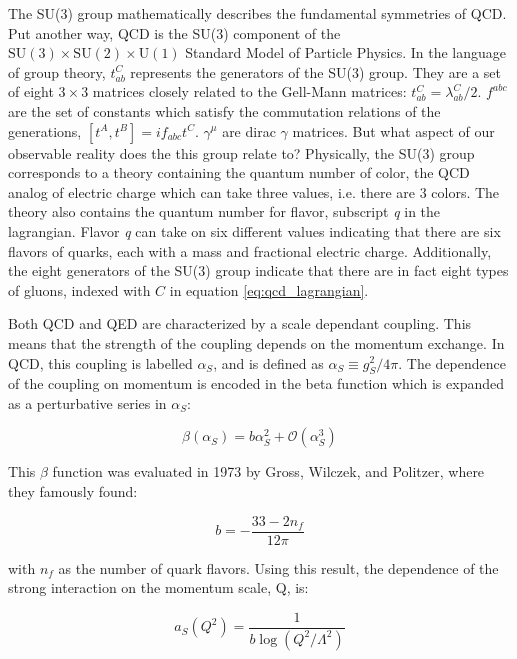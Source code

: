 The SU(3) group mathematically describes the fundamental symmetries of QCD. Put another way, QCD is the SU(3) component of the $\mathrm{SU(3)}\times\mathrm{SU(2)}\times\mathrm{U(1)}$ Standard Model of Particle Physics. In the language of group theory, $t_{ab}^C$ represents the generators of the SU(3) group. They are a set of eight $3\times3$ matrices closely related to the Gell-Mann matrices: $t_{ab}^C = \lambda_{ab}^C/2$. $f^{abc}$ are the set of constants which satisfy the commutation relations of the generations, $[t^A,t^B] = if_{abc}t^C$. $\gamma^\mu$ are dirac $\gamma$ matrices.
But what aspect of our observable reality does the this group relate to? Physically, the SU(3) group corresponds to a theory containing the quantum number of color, the QCD analog of electric charge which can take three values, i.e. there are 3 colors. The theory also contains the quantum number for flavor, subscript \textit{q} in the lagrangian. Flavor \textit{q} can take on six different values indicating that there are six flavors of quarks, each with a mass and  fractional electric charge. Additionally, the eight generators of the SU(3) group indicate that there are in fact eight types of gluons, indexed with $C$ in equation \ref{eq:qcd_lagrangian}.
 
Both QCD and QED are characterized by a scale dependant coupling. This means that the strength of the coupling depends on the momentum exchange. In QCD, this coupling is labelled $\alpha_S$, 
and is defined as  $\alpha_S \equiv g_S^2/4\pi$. The dependence of the 
coupling on momentum is encoded in the beta function which is expanded as a perturbative series in $\alpha_S$:

\begin{equation}
  \beta(\alpha_S) = b\alpha_S^2+\mathcal{O}(\alpha_S^3) 
  \label{eq:beta}
\end{equation}

This $\beta$ function was evaluated in 1973 by Gross, Wilczek, and Politzer, where they famously found:

  \begin{equation}
    b =  -\frac{33 - 2n_f}{12\pi} 
    \label{eq:b}
  \end{equation}

with $n_f$ as the number of quark flavors. Using this result, the dependence of the strong interaction on the momentum scale, Q, is:

  \begin{equation}
    a_S(Q^2) = \frac{1}{b\log(Q^2/\Lambda^2)}
  \label{eq:a_S_running}
  \end{equation}

